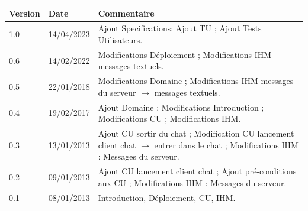 \documentclass[a4paper,11pt,titlepage]{article}
\begin{document}
\vspace{1cm}
\begin{tabular}{|p{1.5cm}|p{2cm}|p{10.1cm}|}
\hline
\textbf{Version} & \textbf{Date} & \textbf{Commentaire} \\
\hline
1.0 & 14/04/2023 & Ajout Specifications; \newline
			Ajout TU ; \newline
			Ajout Tests Utilisateurs. \\
0.6 & 14/02/2022 & Modifications Déploiement ; \newline
			Modifications IHM messages textuels.\\
0.5 & 22/01/2018 & Modifications Domaine ; \newline
			Modifications IHM messages du serveur $\rightarrow$ messages textuels.\\
0.4 & 19/02/2017 & Ajout Domaine ; \newline
			Modifications Introduction ; \newline
			Modifications CU ; \newline
			Modifications IHM. \\
0.3 & 13/01/2013 & Ajout CU sortir du chat ; \newline
			Modification CU lancement client chat $\rightarrow$ entrer dans le chat ; \newline
			Modifications IHM : Messages du serveur.\\
0.2 & 09/01/2013 & Ajout CU lancement client chat ; \newline
			Ajout pré-conditions aux CU ; \newline 
			Modifications IHM : Messages du serveur.\\
0.1 & 08/01/2013 & Introduction, Déploiement, CU, IHM.\\
\hline
\end{tabular}
\newpage


\tableofcontents
\newpage



\newpage



\vspace{-0.5cm}

\newpage


\newpage


\newpage


\newpage
\end{document}
